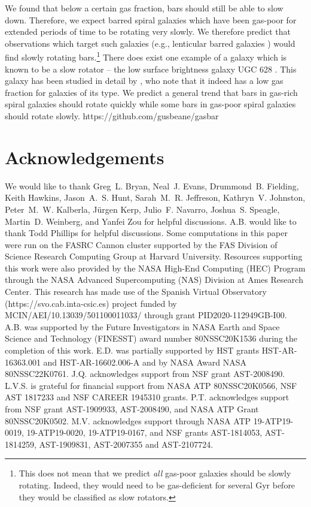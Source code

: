 \documentclass[fleqn,usenatbib]{mnras}
\begin{document}
We found that below a certain gas fraction, bars should still be able to slow
down. Therefore, we expect barred spiral galaxies which have been gas-poor for
extended periods of time to be rotating very slowly. We therefore predict that
observations which target such galaxies (e.g., lenticular barred galaxies
\citep{2009ARAA..47..159B}) would find slowly rotating bars.\footnote{This does
not mean that we predict \textit{all} gas-poor galaxies should be slowly
rotating. Indeed, they would need to be gas-deficient for several $\textrm{Gyr}$
before they would be classified as slow rotators.} There does exist one example
of a galaxy which is known to be a slow rotator -- the low surface brightness
galaxy UGC 628 \citep{2009AA...499L..25C}. This galaxy has been studied in
detail by \citet{2016MNRAS.463.1751C}, who note that it indeed has a low gas
fraction for galaxies of its type. We predict a general trend that bars in
gas-rich spiral galaxies should rotate quickly while some bars in gas-poor
spiral galaxies should rotate slowly.
https://github.com/gusbeane/gasbar
\section*{Acknowledgements}
We would like to thank Greg~L. Bryan, Neal~J. Evans, Drummond~B. Fielding, Keith
Hawkins, Jason~A.~S. Hunt, Sarah~M.~R. Jeffreson, Kathryn~V. Johnston,
Peter~M.~W. Kalberla, Jürgen Kerp, Julio~F. Navarro, Joshua~S. Speagle,
Martin~D. Weinberg, and Yanfei Zou for helpful discussions. A.B. would like to
thank Todd Phillips for helpful discussions. Some computations in this paper
were run on the FASRC Cannon cluster supported by the FAS Division of Science
Research Computing Group at Harvard University. Resources supporting this work
were also provided by the NASA High-End Computing (HEC) Program through the NASA
Advanced Supercomputing (NAS) Division at Ames Research Center. This research
has made use of the Spanish Virtual Observatory (https://svo.cab.inta-csic.es)
project funded by MCIN/AEI/10.13039/501100011033/ through grant
PID2020-112949GB-I00. A.B. was supported by the Future Investigators in NASA
Earth and Space Science and Technology (FINESST) award number 80NSSC20K1536
during the completion of this work. E.D. was partially supported by HST grants
HST-AR-16363.001 and HST-AR-16602.006-A and by NASA Award NASA 80NSSC22K0761.
J.Q. acknowledges support from NSF grant AST-2008490. L.V.S. is grateful for
financial support from NASA ATP 80NSSC20K0566, NSF AST 1817233 and NSF CAREER
1945310 grants. P.T. acknowledges support from NSF grant AST-1909933,
AST-2008490, and NASA ATP Grant 80NSSC20K0502. M.V. acknowledges support through
NASA ATP 19-ATP19-0019, 19-ATP19-0020, 19-ATP19-0167, and NSF grants
AST-1814053, AST-1814259, AST-1909831, AST-2007355 and AST-2107724.
\end{document}
